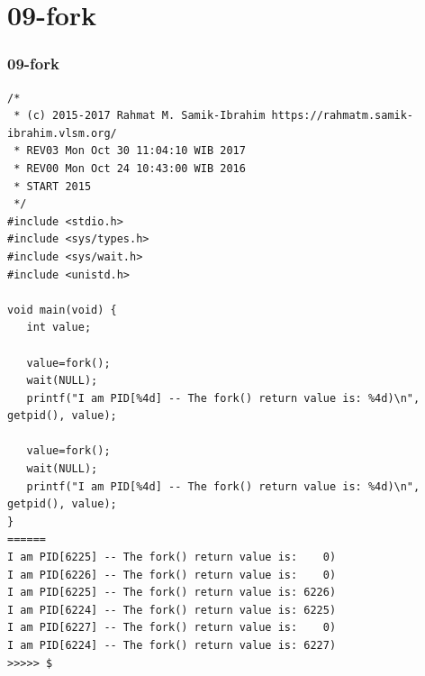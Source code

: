 \documentclass[aspectratio=169, xcolor=table, notheorems, hyperref={pdfpagelabels=false}]{beamer}
\begin{document}
\section{09-fork}
\begin{frame}[fragile]
\frametitle{09-fork}
\begin{lstlisting}[basicstyle=\ttfamily\tiny]
/*
 * (c) 2015-2017 Rahmat M. Samik-Ibrahim https://rahmatm.samik-ibrahim.vlsm.org/
 * REV03 Mon Oct 30 11:04:10 WIB 2017
 * REV00 Mon Oct 24 10:43:00 WIB 2016
 * START 2015
 */
#include <stdio.h>
#include <sys/types.h>
#include <sys/wait.h>
#include <unistd.h>

void main(void) {
   int value;

   value=fork();
   wait(NULL);
   printf("I am PID[%4d] -- The fork() return value is: %4d)\n", getpid(), value);

   value=fork();
   wait(NULL);
   printf("I am PID[%4d] -- The fork() return value is: %4d)\n", getpid(), value);
}
======
I am PID[6225] -- The fork() return value is:    0)
I am PID[6226] -- The fork() return value is:    0)
I am PID[6225] -- The fork() return value is: 6226)
I am PID[6224] -- The fork() return value is: 6225)
I am PID[6227] -- The fork() return value is:    0)
I am PID[6224] -- The fork() return value is: 6227)
>>>>> $ 

\end{lstlisting}
\end{frame}

\end{document}
